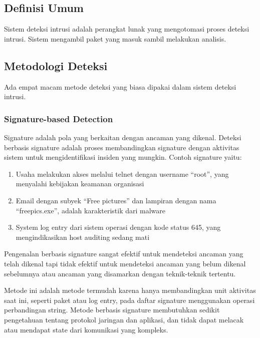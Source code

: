   \subsection{Definisi Umum}

  Sistem deteksi intrusi adalah perangkat lunak yang mengotomasi proses deteksi intrusi. Sistem mengambil paket yang masuk sambil melakukan analisis.  \\

  \subsection{Metodologi Deteksi}

  Ada empat macam metode deteksi yang biasa dipakai dalam sistem deteksi intrusi.

    \subsubsection{Signature-based Detection}

    Signature adalah pola yang berkaitan dengan ancaman yang dikenal. Deteksi berbasis signature adalah proses membandingkan signature dengan aktivitas sistem untuk mengidentifikasi insiden yang mungkin. Contoh signature yaitu: 

    \begin{enumerate}
      \item Usaha melakukan akses melalui telnet dengan username “root”, yang menyalahi kebijakan keamanan organisasi
      \item Email dengan subyek “Free pictures” dan lampiran dengan nama “freepics.exe”, adalah karakteristik dari malware
      \item System log entry dari sistem operasi dengan kode status 645, yang mengindikasikan host auditing sedang mati
    \end{enumerate}
    

    Pengenalan berbasis signature sangat efektif untuk mendeteksi ancaman yang telah dikenal tapi tidak efektif untuk mendeteksi ancaman yang belum dikenal sebelumnya atau ancaman yang disamarkan dengan teknik-teknik tertentu.

    Metode ini adalah metode termudah karena hanya membandingkan unit aktivitas saat ini, seperti paket atau log entry, pada daftar signature menggunakan operasi perbandingan string. Metode berbasis signature membutuhkan sedikit pengetahuan tentang protokol jaringan dan aplikasi, dan tidak dapat melacak atau mendapat state dari komunikasi yang kompleks.

